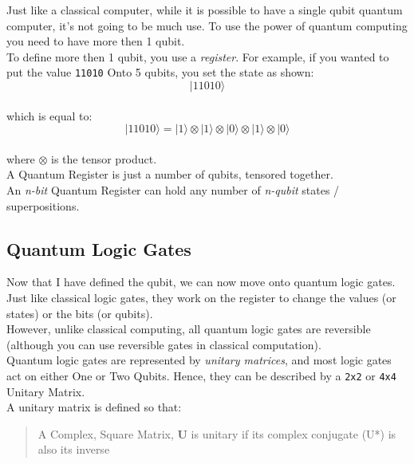 \documentclass{report}
\begin{document}
Just like a classical computer, while it is possible to have a single
qubit quantum computer, it's not going to be much use. To use the power
of quantum computing you need to have more then 1 qubit.\\
To define more then 1 qubit, you use a \emph{register}. For example, if
you wanted to put the value \texttt{11010} Onto 5 qubits, you set the
state as shown:\\
\[
\lvert11010\rangle\]\\
which is equal to:\\
\[
\lvert11010\rangle = \lvert1\rangle \otimes \lvert1\rangle \otimes \lvert0\rangle \otimes \lvert1\rangle \otimes \lvert0\rangle\]\\
where \(\otimes\) is the tensor product.\\
A Quantum Register is just a number of qubits, tensored together.\\
An \emph{n-bit} Quantum Register can hold any number of \emph{n-qubit}
states / superpositions.

\subsection{Quantum Logic Gates}

Now that I have defined the qubit, we can now move onto quantum logic
gates.\\
Just like classical logic gates, they work on the register to change the
values (or states) or the bits (or qubits).\\
However, unlike classical computing, all quantum logic gates are
reversible (although you can use reversible gates in classical
computation).\\
Quantum logic gates are represented by \emph{unitary matrices}, and most
logic gates act on either One or Two Qubits. Hence, they can be
described by a \texttt{2x2} or \texttt{4x4} Unitary Matrix.\\
A unitary matrix is defined so that:

\begin{quote}
A Complex, Square Matrix, \textbf{U} is unitary if its complex conjugate
(U*) is also its inverse
\end{quote}
\end{document}
